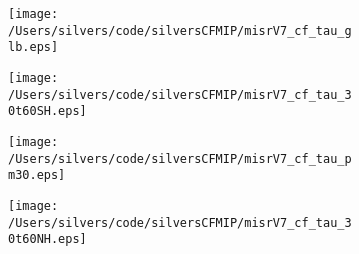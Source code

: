 \documentclass[varwidth, border=10pt]{standalone}
\begin{document}
\begin{figure}
  \centering
  \begin{subfigure}{0.24\textwidth}
  \texttt{[image: /Users/silvers/code/silversCFMIP/misrV7\_cf\_tau\_glb.eps]}
\end{subfigure}
\begin{subfigure}{0.24\textwidth}
  \texttt{[image: /Users/silvers/code/silversCFMIP/misrV7\_cf\_tau\_30t60SH.eps]}
\end{subfigure}
\begin{subfigure}{0.24\textwidth}
  \texttt{[image: /Users/silvers/code/silversCFMIP/misrV7\_cf\_tau\_pm30.eps]}
\end{subfigure}
\begin{subfigure}{0.24\textwidth}
  \texttt{[image: /Users/silvers/code/silversCFMIP/misrV7\_cf\_tau\_30t60NH.eps]}
\end{subfigure}
\end{figure}
\end{document}
